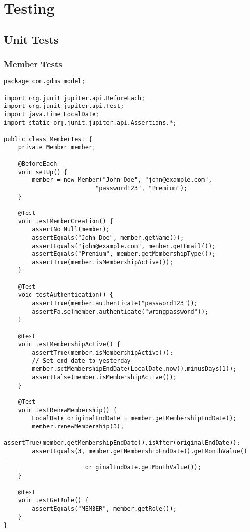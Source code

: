 \documentclass[12pt,a4paper]{report}
\begin{document}
\chapter{Testing}
\section{Unit Tests}

\subsection{Member Tests}
\begin{lstlisting}[caption=MemberTest.java]
package com.gdms.model;

import org.junit.jupiter.api.BeforeEach;
import org.junit.jupiter.api.Test;
import java.time.LocalDate;
import static org.junit.jupiter.api.Assertions.*;

public class MemberTest {
    private Member member;

    @BeforeEach
    void setUp() {
        member = new Member("John Doe", "john@example.com", 
                          "password123", "Premium");
    }

    @Test
    void testMemberCreation() {
        assertNotNull(member);
        assertEquals("John Doe", member.getName());
        assertEquals("john@example.com", member.getEmail());
        assertEquals("Premium", member.getMembershipType());
        assertTrue(member.isMembershipActive());
    }

    @Test
    void testAuthentication() {
        assertTrue(member.authenticate("password123"));
        assertFalse(member.authenticate("wrongpassword"));
    }

    @Test
    void testMembershipActive() {
        assertTrue(member.isMembershipActive());
        // Set end date to yesterday
        member.setMembershipEndDate(LocalDate.now().minusDays(1));
        assertFalse(member.isMembershipActive());
    }

    @Test
    void testRenewMembership() {
        LocalDate originalEndDate = member.getMembershipEndDate();
        member.renewMembership(3);
        assertTrue(member.getMembershipEndDate().isAfter(originalEndDate));
        assertEquals(3, member.getMembershipEndDate().getMonthValue() - 
                       originalEndDate.getMonthValue());
    }

    @Test
    void testGetRole() {
        assertEquals("MEMBER", member.getRole());
    }
}
\end{lstlisting}
\end{document}

